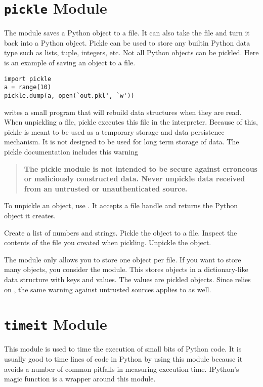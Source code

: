 \begin{enumerate}
\section*{\texttt{pickle} Module}
The  module saves a Python object to a file.
It can also take the file and turn it back into a Python object.
Pickle can be used to store any builtin Python data type such as lists, tuple, integers, etc.
Not all Python objects can be pickled.
Here is an example of saving an object to a file.
\begin{lstlisting}
import pickle
a = range(10)
pickle.dump(a, open(`out.pkl', `w'))
\end{lstlisting}
 writes a small program that will rebuild data structures when they are read.
When unpickling a file, pickle executes this file in the interpreter.
Because of this, pickle is meant to be used as a temporary storage and data persistence mechanism.
It is not designed to be used for long term storage of data.
The pickle documentation includes this warning
\begin{quote}
\textbf{The pickle module is not intended to be secure against erroneous or maliciously constructed data.
Never unpickle data received from an untrusted or unauthenticated source.}
\end{quote}
To unpickle an object, use .
It accepts a file handle and returns the Python object it creates.

\begin{problem}
Create a list of numbers and strings.
Pickle the object to a file.
Inspect the contents of the file you created when pickling.
Unpickle the object.
\end{problem}

The  module only allows you to store one object per file.
If you want to store many objects, you consider the  module.
This stores objects in a dictionary-like data structure with keys and values.
The values are pickled objects.
Since  relies on , the same warning against untrusted sources applies to  as well.

\section*{\texttt{timeit} Module}
This module is used to time the execution of small bits of Python code.
It is usually good to time lines of code in Python by using this module because it avoids a number of common pitfalls in measuring execution time.
IPython's  magic function is a wrapper around this module.


\end{enumerate}
